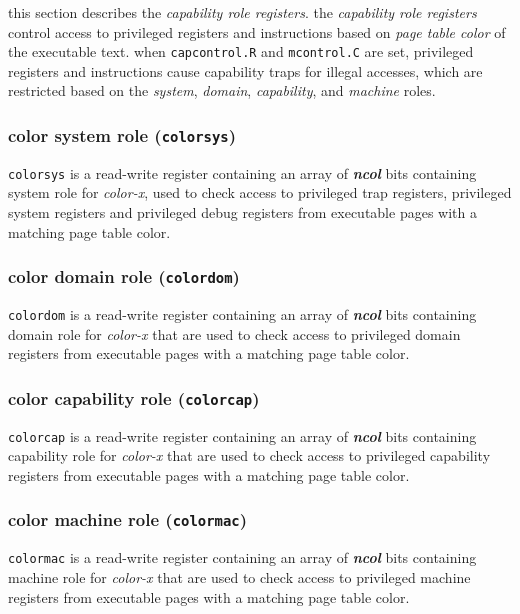 this section describes the \emph{capability role registers}.
the \emph{capability role registers} control access to privileged
registers and instructions based on \emph{page table color} of the
executable text.
when \texttt{capcontrol.R} and \texttt{mcontrol.C} are set, privileged
registers and instructions cause capability traps for illegal accesses,
which are restricted based on the \emph{system}, \emph{domain},
\emph{capability}, and \emph{machine} roles.

\subsubsection{color system role (\texttt{colorsys})}
\texttt{colorsys} is a read-write register containing an array of
\textbf{\emph{ncol}} bits containing system role for
\emph{color-x}, used to check access to privileged trap
registers, privileged system registers and privileged debug registers
from executable pages with a matching page table color.
\\

\subsubsection{color domain role (\texttt{colordom})}
\texttt{colordom} is a read-write register containing an array
of \textbf{\emph{ncol}} bits containing domain role for \emph{color-x}
that are used to check access to privileged domain registers from
executable pages with a matching page table color.
\\

\subsubsection{color capability role (\texttt{colorcap})}
\texttt{colorcap} is a read-write register containing an array
of \textbf{\emph{ncol}} bits containing capability role for \emph{color-x}
that are used to check access to privileged capability registers from
executable pages with a matching page table color.
\\

\subsubsection{color machine role (\texttt{colormac})}
\texttt{colormac} is a read-write register containing an array
of \textbf{\emph{ncol}} bits containing machine role for \emph{color-x}
that are used to check access to privileged machine registers from
executable pages with a matching page table color.
\\
\fi

